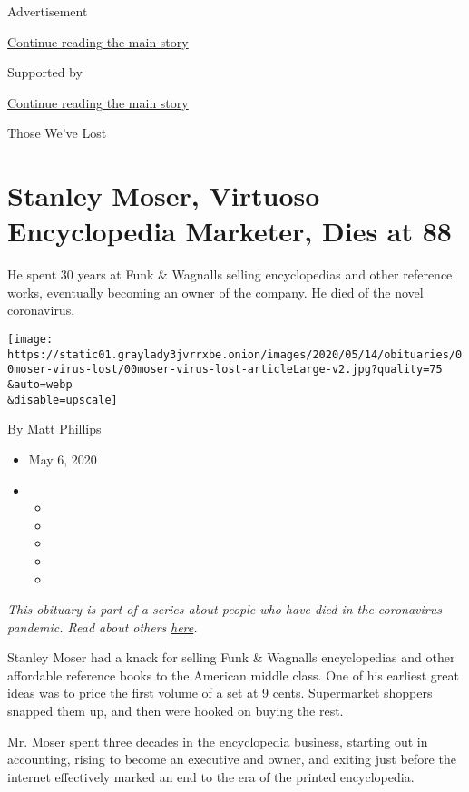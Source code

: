 Advertisement

\protect\hyperlink{after-top}{Continue reading the main story}

Supported by

\protect\hyperlink{after-sponsor}{Continue reading the main story}

Those We've Lost

\hypertarget{stanley-moser-virtuoso-encyclopedia-marketer-dies-at-88}{%
\section{Stanley Moser, Virtuoso Encyclopedia Marketer, Dies at
88}\label{stanley-moser-virtuoso-encyclopedia-marketer-dies-at-88}}

He spent 30 years at Funk \& Wagnalls selling encyclopedias and other
reference works, eventually becoming an owner of the company. He died of
the novel coronavirus.

\texttt{[image: https://static01.graylady3jvrrxbe.onion/images/2020/05/14/obituaries/00moser-virus-lost/00moser-virus-lost-articleLarge-v2.jpg?quality=75\\\&auto=webp\\\&disable=upscale]}

By \href{https://www.nytimes3xbfgragh.onion/by/matt-phillips}{Matt
Phillips}

\begin{itemize}
\item
  May 6, 2020
\item
  \begin{itemize}
  \item
  \item
  \item
  \item
  \item
  \end{itemize}
\end{itemize}

\emph{This obituary is part of a series about people who have died in
the coronavirus pandemic. Read about others}
\href{https://www.nytimes3xbfgragh.onion/series/people-who-have-died-of-the-coronavirus}{\emph{here}}\emph{.}

Stanley Moser had a knack for selling Funk \& Wagnalls encyclopedias and
other affordable reference books to the American middle class. One of
his earliest great ideas was to price the first volume of a set at 9
cents. Supermarket shoppers snapped them up, and then were hooked on
buying the rest.

Mr. Moser spent three decades in the encyclopedia business, starting out
in accounting, rising to become an executive and owner, and exiting just
before the internet effectively marked an end to the era of the printed
encyclopedia.

